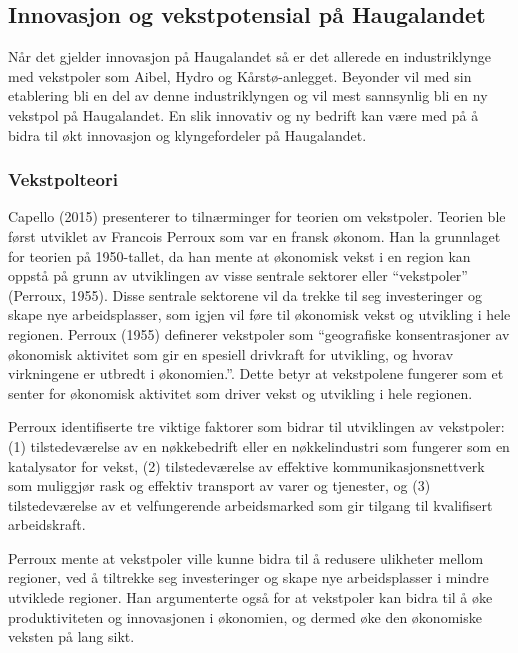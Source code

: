 \documentclass[
]{article}
\begin{document}
\hypertarget{innovasjon-og-vekstpotensial-puxe5-haugalandet}{%
\subsection{Innovasjon og vekstpotensial på
Haugalandet}\label{innovasjon-og-vekstpotensial-puxe5-haugalandet}}

Når det gjelder innovasjon på Haugalandet så er det allerede en
industriklynge med vekstpoler som Aibel, Hydro og Kårstø-anlegget.
Beyonder vil med sin etablering bli en del av denne industriklyngen og
vil mest sannsynlig bli en ny vekstpol på Haugalandet. En slik innovativ
og ny bedrift kan være med på å bidra til økt innovasjon og
klyngefordeler på Haugalandet.

\hypertarget{vekstpolteori}{%
\subsubsection{Vekstpolteori}\label{vekstpolteori}}

Capello (2015) presenterer to tilnærminger for teorien om vekstpoler.
Teorien ble først utviklet av Francois Perroux som var en fransk økonom.
Han la grunnlaget for teorien på 1950-tallet, da han mente at økonomisk
vekst i en region kan oppstå på grunn av utviklingen av visse sentrale
sektorer eller ``vekstpoler'' (Perroux, 1955). Disse sentrale sektorene
vil da trekke til seg investeringer og skape nye arbeidsplasser, som
igjen vil føre til økonomisk vekst og utvikling i hele regionen. Perroux
(1955) definerer vekstpoler som ``geografiske konsentrasjoner av
økonomisk aktivitet som gir en spesiell drivkraft for utvikling, og
hvorav virkningene er utbredt i økonomien.''. Dette betyr at vekstpolene
fungerer som et senter for økonomisk aktivitet som driver vekst og
utvikling i hele regionen.

Perroux identifiserte tre viktige faktorer som bidrar til utviklingen av
vekstpoler: (1) tilstedeværelse av en nøkkebedrift eller en
nøkkelindustri som fungerer som en katalysator for vekst, (2)
tilstedeværelse av effektive kommunikasjonsnettverk som muliggjør rask
og effektiv transport av varer og tjenester, og (3) tilstedeværelse av
et velfungerende arbeidsmarked som gir tilgang til kvalifisert
arbeidskraft.

Perroux mente at vekstpoler ville kunne bidra til å redusere ulikheter
mellom regioner, ved å tiltrekke seg investeringer og skape nye
arbeidsplasser i mindre utviklede regioner. Han argumenterte også for at
vekstpoler kan bidra til å øke produktiviteten og innovasjonen i
økonomien, og dermed øke den økonomiske veksten på lang sikt.
\end{document}
